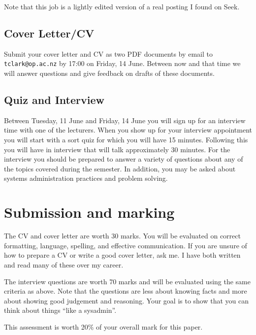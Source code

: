 \documentclass{article}   	%
\begin{document}
Note that this job is a lightly edited version of a real posting I found on Seek.

\subsection{Cover Letter/CV}

Submit your cover letter and CV as two PDF documents by email to \texttt{tclark@op.ac.nz} by 17:00 on Friday, 14 June.  Between now and that time we will answer questions and give feedback on drafts of these documents.  

\subsection{Quiz and Interview}

Between Tuesday, 11 June and Friday, 14 June you will sign up for an interview time with one of the lecturers. When you show up for your interview appointment you will start with a sort quiz for which you will have 15 minutes. Following this you will have in interview that will talk approximately 30 minutes. For the interview you should be prepared to answer a variety of questions about any of the topics covered during the semester. In addition, you may be asked about systems administration practices and problem solving.

\newpage

\section{Submission and marking}

The CV and cover letter are worth 30 marks. You will be evaluated on correct formatting, language, spelling, and effective communication. If you are unsure of how to prepare a CV or write a good cover letter, ask me. I have both written and read many of these over my career. 

The interview questions are worth 70 marks and will be evaluated using the same criteria as above. Note that the questions are less about knowing facts and more about showing good judgement and reasoning. Your goal is to show that you can think about things ``like a sysadmin''.

This assessment is worth 20\% of your overall mark for this paper.
 
\end{document}
